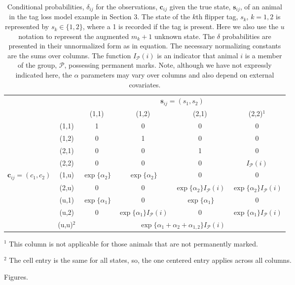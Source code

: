 \documentclass[sts]{imsart}
\numberwithin{equation}{section}
\theoremstyle{plain}
\newcommand{\bs}{\ensuremath{\mathbf{s}}}
\newcommand{\bc}{\ensuremath{\mathbf{c}}}
\begin{document}
\begin{table}[ht]
\centering
\parbox{\textwidth}{\caption{\label{tb:tagloss.delta}  Conditional probabilities, $\delta_{ij}$ for the observations, $\bc_{ij}$ given the true state, $\bs_{ij}$, of an animal in the tag loss model example in Section 3. The state of the $k$th flipper tag, $s_k$, $k=1,2$ is represented by $s_k \in \{1,2\}$, where a 1 is recorded if the tag is present. Here we also use the $u$ notation to represent the augmented $m_k+1$ unknown state. The $\delta$ probabilities are presented in their unnormalized form as in equation. The necessary normalizing constants are the sums over columns. The function $I_{\mathcal{P}}(i)$ is an indicator that animal $i$ is a member of the group, $\mathcal{P}$, possessing permanent marks. Note, although we have not expressly indicated here, the $\alpha$ parameters may vary over columns and also depend on external covariates.}}

\begin{tabular}{cc|cccc|} \cline{3-6}
                                     &                            & \multicolumn{4}{c|}{$\bs_{ij} = (s_1,s_2)$}\\ %
                                     &                            & (1,1) & (1,2) & (2,1) & (2,2)$^1$  \\ \hline
\multicolumn{1}{|c}{}                & \multicolumn{1}{c|}{(1,1)} & 1 & 0 & 0 & 0 \\
\multicolumn{1}{|c}{}                & \multicolumn{1}{c|}{(1,2)} & 0 & 1  & 0 & 0 \\
\multicolumn{1}{|c}{}                & \multicolumn{1}{c|}{(2,1)} & 0 & 0 & 1 & 0 \\
\multicolumn{1}{|c}{}                & \multicolumn{1}{c|}{(2,2)} & 0 & 0 & 0 & $I_\mathcal{P}(i)$ \\ 
\multicolumn{1}{|c}{$\bc_{ij}=(c_1,c_2)$} & \multicolumn{1}{c|}{(1,u)} & $\exp\{\alpha_2\}$ & $\exp\{\alpha_2\}$ & 0 & 0 \\
\multicolumn{1}{|c}{}                & \multicolumn{1}{c|}{(2,u)} & 0 & 0 & $\exp\{\alpha_2\}I_\mathcal{P}(i)$ & $\exp\{\alpha_2\}I_\mathcal{P}(i)$\\
\multicolumn{1}{|c}{}                & \multicolumn{1}{c|}{(u,1)} & $\exp\{\alpha_1\}$ & 0 & $\exp\{\alpha_1\}$ & 0\\
\multicolumn{1}{|c}{}                & \multicolumn{1}{c|}{(u,2)} & 0 & $\exp\{\alpha_1\}I_\mathcal{P}(i)$ & 0 & $\exp\{\alpha_1\}I_\mathcal{P}(i)$\\
\multicolumn{1}{|c}{}                & \multicolumn{1}{c|}{(u,u)$^2$} & \multicolumn{4}{c|}{$\exp\{\alpha_1+\alpha_2 + \alpha_{1,2}\}I_\mathcal{P}(i)$}  \\
\hline
\end{tabular}\medskip

\parbox{\textwidth}{ \footnotesize
$^1$ This column is not applicable for those animals that are not permanently marked.

$^2$ The cell entry is the same for all states, so, the one centered entry applies across all columns.
}
\end{table}


\clearpage

Figures.

\clearpage
\end{document}
